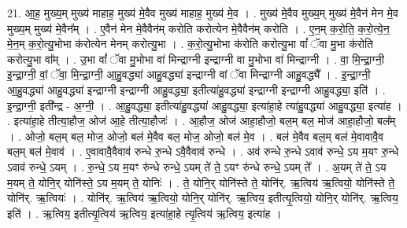 \documentclass[17pt]{extarticle}
\begin{document}
21. आ॒ह॒ मुख्य॒म् मुख्य॑ माहाह॒ मुख्य॑ मे॒वैव मुख्य॑ माहाह॒ मुख्य॑ मे॒व । . मुख्य॑ मे॒वैव मुख्य॒म् मुख्य॑ मे॒वैन॑ मेन मे॒व मुख्य॒म् मुख्य॑ मे॒वैन᳚म् । . ए॒वैन॑ मेन मे॒वैवैन॑म् करोति करोत्येन मे॒वैवैन॑म् करोति । . ए॒न॒म् क॒रो॒ति॒ क॒रो॒त्ये॒न॒ मे॒न॒म् क॒रो॒त्यु॒भोभा क॑रोत्येन मेनम् करोत्यु॒भा । . क॒रो॒त्यु॒भोभा क॑रोति करोत्यु॒भा वां᳚ ॅवा मु॒भा क॑रोति करोत्यु॒भा वा᳚म् । . उ॒भा वां᳚ ॅवा मु॒भोभा वा॑ मिन्द्राग्नी इन्द्राग्नी वा मु॒भोभा वा॑ मिन्द्राग्नी । . वा॒ मि॒न्द्रा॒ग्नी॒ इ॒न्द्रा॒ग्नी॒ वां॒ ॅवा॒ मि॒न्द्रा॒ग्नी॒ आ॒हु॒वद्ध्या॑ आहु॒वद्ध्या॑ इन्द्राग्नी वां ॅवा मिन्द्राग्नी आहु॒वद्ध्यै᳚ । . इ॒न्द्रा॒ग्नी॒ आ॒हु॒वद्ध्या॑ आहु॒वद्ध्या॑ इन्द्राग्नी इन्द्राग्नी आहु॒वद्ध्या॒ इतीत्या॑हु॒वद्ध्या॑ इन्द्राग्नी इन्द्राग्नी आहु॒वद्ध्या॒ इति॑ । . इ॒न्द्रा॒ग्नी॒ इती᳚न्द्र - अ॒ग्नी॒ । . आ॒हु॒वद्ध्या॒ इतीत्या॑हु॒वद्ध्या॑ आहु॒वद्ध्या॒ इत्या॑हा॒हे त्या॑हु॒वद्ध्या॑ आहु॒वद्ध्या॒ इत्या॑ह । . इत्या॑हा॒हे तीत्या॒हौज॒ ओज॑ आ॒हे तीत्या॒हौजः॑ । . आ॒हौज॒ ओज॑ आहा॒हौजो॒ बल॒म् बल॒ मोज॑ आहा॒हौजो॒ बल᳚म् । . ओजो॒ बल॒म् बल॒ मोज॒ ओजो॒ बल॑ मे॒वैव बल॒ मोज॒ ओजो॒ बल॑ मे॒व । . बल॑ मे॒वैव बल॒म् बल॑ मे॒वावावै॒व बल॒म् बल॑ मे॒वाव॑ । . ए॒वावावै॒वैवाव॑ रुन्धे रु॒न्धे ऽवै॒वैवाव॑ रुन्धे । . अव॑ रुन्धे रु॒न्धे ऽवाव॑ रुन्धे॒ ऽय म॒यꣳ रु॒न्धे ऽवाव॑ रुन्धे॒ ऽयम् । . रु॒न्धे॒ ऽय म॒यꣳ रु॑न्धे रुन्धे॒ ऽयम् ते॑ ते॒ ऽयꣳ रु॑न्धे रुन्धे॒ ऽयम् ते᳚ । . अ॒यम् ते॑ ते॒ ऽय म॒यम् ते॒ योनि॒र् योनि॑स्ते॒ ऽय म॒यम् ते॒ योनिः॑ । . ते॒ योनि॒र् योनि॑स्ते ते॒ योनि॑र्. ऋ॒त्विय॑ ऋ॒त्वियो॒ योनि॑स्ते ते॒ योनि॑र्. ऋ॒त्वियः॑ । . योनि॑र्. ऋ॒त्विय॑ ऋ॒त्वियो॒ योनि॒र् योनि॑र्. ऋ॒त्विय॒ इतीत्यृ॒त्वियो॒ योनि॒र् योनि॑र्. ऋ॒त्विय॒ इति॑ । . ऋ॒त्विय॒ इतीत्यृ॒त्विय॑ ऋ॒त्विय॒ इत्या॑हा॒हे त्यृ॒त्विय॑ ऋ॒त्विय॒ इत्या॑ह । \newline
\end{document}
